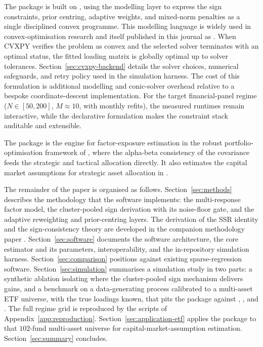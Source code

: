 \documentclass[article]{jss}
\begin{document}
The package is built on  \citep{Diamond+Boyd:2016}, using the modelling layer to express the sign constraints, prior centring, adaptive weights, and mixed-norm penalties as a single disciplined convex programme. This modelling language is widely used in convex-optimisation research and
itself published in this journal as  \citep{Fu+Narasimhan+Boyd:2020}. When CVXPY
verifies the problem as convex and the selected solver terminates with an
optimal status, the fitted loading matrix is globally optimal up to solver
tolerances. Section~\ref{sec:cvxpy-backend} details the solver choices,
numerical safeguards, and retry policy used in the simulation harness. The
cost of this formulation is additional modelling and conic-solver overhead
relative to a bespoke coordinate-descent implementation. For the target
financial-panel regime ($N \in [50,200]$, $M \approx 10$, with monthly refits), the measured runtimes remain interactive, while the
declarative formulation makes the constraint stack auditable and extensible.


The  package is the engine for factor-exposure
estimation in the robust portfolio-optimisation framework of
\cite{Sepp+Ossa+Kastenholz:2026}, where the alpha-beta consistency of
the covariance feeds the strategic and tactical allocation directly.
It also estimates the capital market assumptions for strategic asset
allocation in \cite{Sepp+Hansen+Kastenholz:2026MATF}.



The remainder of the paper is organised as follows.
Section~\ref{sec:methods} describes the methodology that the software
implements: the multi-response factor model, the cluster-pooled sign
derivation with its noise-floor gate, and the adaptive reweighting and
prior-centring layers. The derivation of the SSR identity and the
sign-consistency theory are developed in the companion methodology paper
\citep{Sepp+Kastenholz:2026sign}.
Section~\ref{sec:software} documents the  software
architecture, the core  estimator and its parameters,
 interoperability, and the in-repository simulation
harness. Section~\ref{sec:comparison} positions 
against existing sparse-regression software. Section~\ref{sec:simulation}
summarises a simulation study in two parts: a synthetic ablation
isolating where the cluster-pooled sign mechanism delivers gains, and a
benchmark on a data-generating process calibrated to a multi-asset ETF
universe, with the true loadings known, that pits the package against
, , and 
\citep{Bertrand+etal:2022}. The full
regime grid is reproduced by the scripts of Appendix~\ref{app:reproduction}.
Section~\ref{sec:application-etf} applies the package to that $102$-fund
multi-asset universe for capital-market-assumption estimation.
Section~\ref{sec:summary} concludes.
\end{document}
